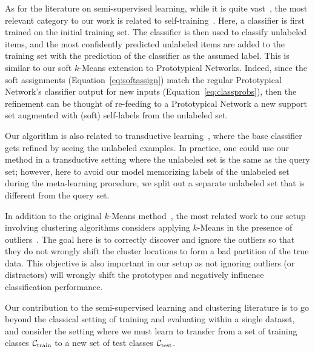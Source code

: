 As for the literature on semi-supervised learning, while it is quite vast~\citep{zhu2005semi,
ChapelleO2010}, the most relevant category to our work is related to 
self-training~\citep{yarowsky1995unsupervised, rosenberg2005semi}. Here, a classifier is first trained on
the initial training set. The classifier is then used to classify unlabeled items, and the most
confidently predicted unlabeled items are added to the training set with the prediction of the
classifier as the assumed label.  This is similar to our soft $k$-Means extension to Prototypical
Networks. Indeed, since the soft assignments (Equation~\ref{eq:softassign}) match the regular
Prototypical Network's classifier output for new inputs (Equation~\ref{eq:classprobs}), then the
refinement can be thought of re-feeding to a Prototypical Network a new support set  augmented with
(soft) self-labels from the unlabeled set.

Our algorithm is also related to transductive 
learning~\citep{vapnik1998statistical,Joachims1999TSVM,Fu2015TransductiveZSL}, where the base
classifier gets refined by seeing the unlabeled examples. In practice, one could use our method in a
transductive setting where the unlabeled set is the same as the query set; 
however, here to avoid our model memorizing labels of the unlabeled set during the meta-learning 
procedure, we split out a separate unlabeled set that is different from the query set.

In addition to the original $k$-Means method~\citep{lloyd1982least}, the most related work to our
setup involving clustering algorithms considers applying $k$-Means in the presence of
outliers~\citep{hautamaki2005improving, chawla2013k, gupta2017local}. The goal here is to correctly
discover and ignore the outliers so that they do not wrongly shift the cluster locations to form a
bad partition of the true data. This objective is also important in our setup as not ignoring
outliers (or distractors) will wrongly shift the prototypes and negatively influence classification
performance.

Our contribution to the semi-supervised learning and clustering literature is to go beyond the
classical setting of training and evaluating within a single dataset, and consider the setting where
we must learn to transfer from a set of training classes ${\cal C}_{\rm train}$ to a new set of test
classes ${\cal C}_{\rm test}$.

